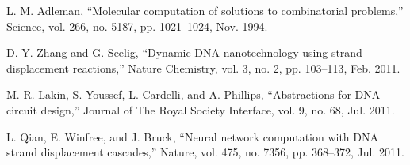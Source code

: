 \documentclass{article}
\begin{document}
\begin{thebibliography}{9}

L. M. Adleman,
“Molecular computation of solutions to combinatorial problems,”
Science, vol. 266, no. 5187, pp. 1021–1024, Nov. 1994.

D. Y. Zhang and G. Seelig,
“Dynamic DNA nanotechnology using strand-displacement reactions,”
Nature Chemistry, vol. 3, no. 2, pp. 103–113, Feb. 2011.

M. R. Lakin, S. Youssef, L. Cardelli, and A. Phillips,
“Abstractions for DNA circuit design,”
Journal of The Royal Society Interface, vol. 9, no. 68, Jul. 2011.

L. Qian, E. Winfree, and J. Bruck, “Neural network computation with DNA strand
displacement cascades,” Nature, vol. 475, no. 7356, pp. 368–372, Jul. 2011.

\end{thebibliography}
\end{document}
